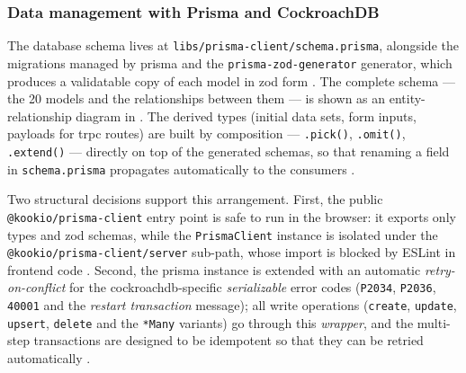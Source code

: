 \subsubsection{Data management with Prisma and CockroachDB}\label{subsec:gestionarea-datelor}

The database schema lives at \texttt{libs/prisma-client/schema.prisma}, alongside the migrations managed by \gls{prisma} and the \texttt{prisma-zod-generator} generator, which produces a validatable copy of each model in \gls{zod} form \cite{prisma_orm,prisma_zod_generator}. The complete schema --- the 20 models and the relationships between them --- is shown as an entity-relationship diagram in . The derived types (initial data sets, form inputs, payloads for \gls{trpc} routes) are built by composition --- \texttt{.pick()}, \texttt{.omit()}, \texttt{.extend()} --- directly on top of the generated schemas, so that renaming a field in \texttt{schema.prisma} propagates automatically to the consumers \cite{prisma_zod_generator}.

Two structural decisions support this arrangement. First, the public \texttt{@kookio/prisma-client} entry point is safe to run in the browser: it exports only types and \gls{zod} schemas, while the \texttt{PrismaClient} instance is isolated under the \texttt{@kookio/prisma-client/server} sub-path, whose import is blocked by ESLint in frontend code \cite{prisma_orm}. Second, the \gls{prisma} instance is extended with an automatic \textit{retry-on-conflict} for the \gls{cockroachdb}-specific \textit{serializable} error codes (\texttt{P2034}, \texttt{P2036}, \texttt{40001} and the \textit{restart transaction} message); all write operations (\texttt{create}, \texttt{update}, \texttt{upsert}, \texttt{delete} and the \texttt{*Many} variants) go through this \textit{wrapper}, and the multi-step transactions are designed to be idempotent so that they can be retried automatically \cite{prisma_transactions,cockroachdb}.

